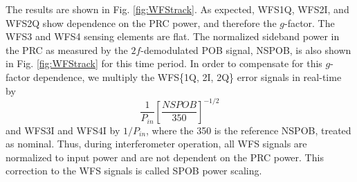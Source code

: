 The results are shown in Fig. \ref{fig:WFStrack}. As expected, WFS1Q,
WFS2I, and WFS2Q show dependence on the PRC power, and therefore the
$g$-factor. The WFS3 and WFS4 sensing elements are flat. The
normalized sideband power in the PRC as measured by the
$2f$-demodulated POB signal, NSPOB, is also shown in
Fig. \ref{fig:WFStrack} for this time period. In order to compensate
for this $g$-factor dependence, we multiply the WFS\{1Q, 2I, 2Q\}
error signals in real-time by
\begin{equation}
\frac{1}{P_{in}} \left[\frac{NSPOB}{350}\right]^{-1/2}
\end{equation}
and WFS3I and WFS4I by $1/P_{in}$, where the 350 is the reference
NSPOB, treated as nominal. Thus, during interferometer operation, all
WFS signals are normalized to input power and are not dependent on the
PRC power. This correction to the WFS signals is called SPOB power
scaling.



